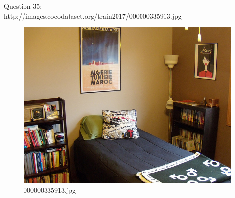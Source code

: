     Question 35:\\http://images.cocodataset.org/train2017/000000335913.jpg
    \begin{figure}[h]
        \centering
        \includegraphics[width=0.8\linewidth]{../image set/easy/000000335913.jpg}
        \caption{000000335913.jpg}
    \end{figure}

